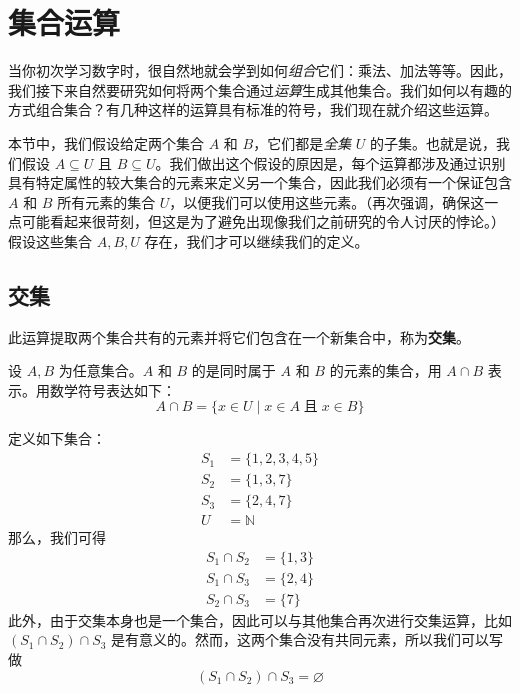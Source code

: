 \section{集合运算}\label{sec:section3.5}

当你初次学习数字时，很自然地就会学到如何\textit{组合}它们：乘法、加法等等。因此，我们接下来自然要研究如何将两个集合通过\textit{运算}生成其他集合。我们如何以有趣的方式组合集合？有几种这样的运算具有标准的符号，我们现在就介绍这些运算。

本节中，我们假设给定两个集合 $A$ 和 $B$，它们都是\textit{全集} $U$ 的子集。也就是说，我们假设 $A \subseteq U$ 且 $B \subseteq U$。我们做出这个假设的原因是，每个运算都涉及通过识别具有特定属性的较大集合的元素来定义另一个集合，因此我们必须有一个保证包含 $A$ 和 $B$ 所有元素的集合 $U$，以便我们可以使用这些元素。（再次强调，确保这一点可能看起来很苛刻，但这是为了避免出现像我们之前研究的令人讨厌的悖论。）假设这些集合 $A, B,U$ 存在，我们才可以继续我们的定义。

\subsection{交集}

此运算提取两个集合共有的元素并将它们包含在一个新集合中，称为\textbf{交集}。

\begin{definition}
    设 $A, B$ 为任意集合。$A$ 和 $B$ 的是同时属于 $A$ 和 $B$ 的元素的集合，用 $A \cap B$ 表示。用数学符号表达如下：
    \[A \cap B = \{x \in U \mid x \in A \;\text{且}\; x \in B\}\]
\end{definition}

\begin{example}\label{ex:example3.5.1}
    定义如下集合：
    \begin{align*}
        S_1 &= \{1, 2, 3, 4, 5\}\\
        S_2 &= \{1, 3, 7\}\\
        S_3 &= \{2, 4, 7\}\\
        U &= \mathbb{N}
    \end{align*}
    那么，我们可得
    \begin{align*}
        S_1 \cap S_2 &= \{1, 3\} \\
        S_1 \cap S_3 &= \{2, 4\} \\
        S_2 \cap S_3 &= \{7\}
    \end{align*}
    此外，由于交集本身也是一个集合，因此可以与其他集合再次进行交集运算，比如 $(S_1 \cap S_2) \cap S_3$ 是有意义的。然而，这两个集合没有共同元素，所以我们可以写做
    \[(S_1 \cap S_2) \cap S_3 = \varnothing\]
\end{example}

